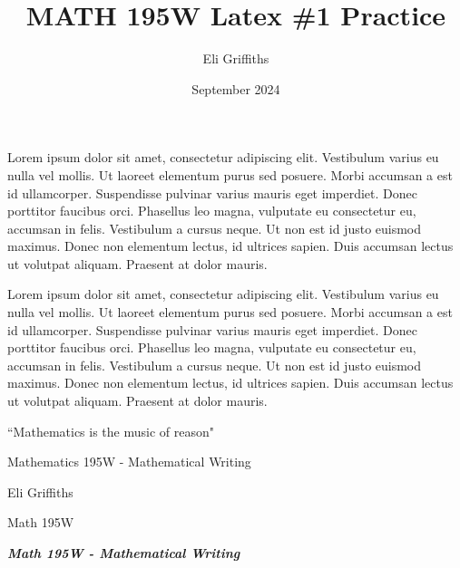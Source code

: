 \documentclass{article}
\title{MATH 195W Latex \#1 Practice}
\author{Eli Griffiths}
\date{September 2024}
\begin{document}
\maketitle

Lorem ipsum dolor sit amet, consectetur adipiscing elit. Vestibulum varius eu nulla vel mollis. Ut laoreet elementum purus sed posuere. Morbi accumsan a est id ullamcorper. Suspendisse pulvinar varius mauris eget imperdiet. Donec porttitor faucibus orci. Phasellus leo magna, vulputate eu consectetur eu, accumsan in felis. Vestibulum a cursus neque. Ut non est id justo euismod maximus. Donec non elementum lectus, id ultrices sapien. Duis accumsan lectus ut volutpat aliquam. Praesent at dolor mauris.
\vspace{1in}

Lorem ipsum dolor sit amet, consectetur adipiscing elit. Vestibulum varius eu nulla vel mollis. Ut laoreet elementum purus sed posuere. Morbi accumsan a est id ullamcorper. Suspendisse pulvinar varius mauris eget imperdiet. Donec porttitor faucibus orci. Phasellus leo magna, vulputate eu consectetur eu, accumsan in felis. Vestibulum a cursus neque. Ut non est id justo euismod maximus. Donec non elementum lectus, id ultrices sapien. Duis accumsan lectus ut volutpat aliquam. Praesent at dolor mauris.

``Mathematics is the music of reason"

\begin{center}
    Mathematics {\large 195W} - Mathematical Writing
\end{center}

\begin{flushright}
    Eli Griffiths

    \tiny Math 195W
\end{flushright}

\begin{center}
    \Large
    \textbf{\textit{
    Math 195W - Mathematical Writing
    }}
\end{center}
\end{document}

